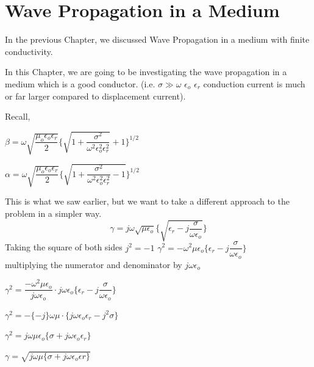 \chapter{Wave Propagation in a Medium}\label{chp:lecture26}
In the previous Chapter, we discussed Wave Propagation in a medium with finite conductivity.

In this Chapter, we are going to be investigating the wave propagation in a medium which is a good conductor. (i.e. $\sigma \gg \omega$ $\epsilon_{o}$ $\epsilon_{r}$ conduction current is much or far larger compared to displacement current). \newline

Recall,
\begin{center}
$\beta=\omega\sqrt{\dfrac{\mu_{o}\epsilon_{o}\epsilon_{r}}{2}}\Bigg\{{\sqrt{1+\dfrac{\sigma^{2}}{\omega^{2}\epsilon_{o}^{2}\epsilon_{r}^{2}}}+1 }\Bigg\}^{1/2}$
\end{center}

\begin{center}
$\alpha=\omega\sqrt{\dfrac{\mu_{o}\epsilon_{o}\epsilon_{r}}{2}}\Bigg\{\sqrt{1+\dfrac{\sigma^{2}}{\omega^{2}\epsilon_{o}^{2}\epsilon_{r}^{2}}-1} \Bigg\}^{1/2}$	
\end{center}

This is what we saw earlier, but we want to take a different approach to the problem in a simpler way.
\begin{equation}
\gamma=j\omega\sqrt{\mu\epsilon_{o}}\Bigg\{\sqrt{\epsilon_{r}-j\dfrac{\sigma}{\omega\epsilon_{o}}}\Bigg\}
\end{equation}		
Taking the square of both sides
$j^{2}= -1$ 
$\gamma^{2}=-\omega^{2}\mu\epsilon_{o}\Bigg\{\epsilon_{r}-j\dfrac{\sigma}{\omega\epsilon_{o}}\Bigg\}$\\
multiplying the numerator and denominator by $j\omega\epsilon_{o}$

$\gamma^{2}=\dfrac{-\omega^{2}\mu\epsilon_{o}}{j\omega\epsilon_{o}}\cdot j\omega\epsilon_{o}\Bigg\{\epsilon_{r}-j\dfrac{\sigma}{\omega\epsilon_{o}}\Bigg\}$

\begin{center}
$\gamma^{2}=-\{-j\}\omega\mu\cdot\{j\omega\epsilon_{o}\epsilon_{r}-j^{2}\sigma\}$
\end{center}

\begin{center}
$\gamma^{2}=j\omega\mu\epsilon_{o}\{\sigma+j\omega\epsilon_{o}\epsilon_{r}\}$	
\end{center}

\begin{center}
$\gamma=\sqrt{j\omega\mu\{\sigma+j\omega\epsilon_{o}\epsilon{r}\}}$	
\end{center}

